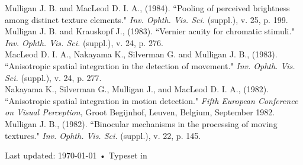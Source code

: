 \documentclass[12pt]{article}
\newcommand{\years}[1]{\marginnote{\scriptsize #1}}
\begin{document}
\years{1984}
Mulligan J. B. and MacLeod D. I. A., (1984).
``Pooling of perceived brightness among distinct texture elements."
\emph{Inv. Ophth. Vis. Sci.} (suppl.), v. 25, p. 199.\\

\years{1983}
Mulligan J. B. and Krauskopf J., (1983).
``Vernier acuity for chromatic stimuli."
\emph{Inv. Ophth. Vis. Sci.} (suppl.), v. 24, p. 276.\\

MacLeod D. I. A., Nakayama K., Silverman G. and Mulligan J. B., (1983).
``Anisotropic spatial integration in the detection of movement."
\emph{Inv. Ophth. Vis. Sci.} (suppl.), v. 24, p. 277.\\

\years{1982}
Nakayama K., Silverman G., Mulligan J., and MacLeod D. I. A., (1982).
``Anisotropic spatial integration in motion detection."
\emph{Fifth European Conference on Visual Perception}, Groot Begijnhof, Leuven, Belgium, September 1982.\\

Mulligan J. B., (1982).
``Binocular mechanisms in the processing of moving textures."
\emph{Inv. Ophth. Vis. Sci.}
(suppl.), v. 22, p. 145.

\noindent

\begin{center}
{\scriptsize  Last updated: \today\- •\- 
Typeset in \href{http://nitens.org/taraborelli/cvtex}{
\XeTeX } 
}
\end{center}
\end{document}
